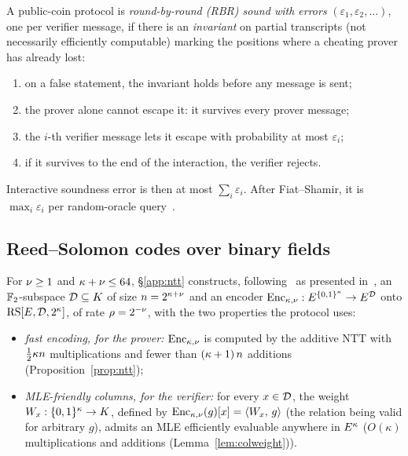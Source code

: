 \begin{definition}\label{def:rbr}
A public-coin protocol is \emph{round-by-round (RBR) sound with errors} $(\varepsilon_1, \varepsilon_2, \dots)$, one per verifier message, if there is an \emph{invariant} on partial transcripts (not necessarily efficiently computable) marking the positions where a cheating prover has already lost:
\begin{enumerate}[itemsep=1pt,label=(\roman*)]
\item on a false statement, the invariant holds before any message is sent;
\item the prover alone cannot escape it: it survives every prover message;
\item the $i$-th verifier message lets it escape with probability at most $\varepsilon_i$;
\item if it survives to the end of the interaction, the verifier rejects.
\end{enumerate}
\end{definition}

Interactive soundness error is then at most $\sum_i \varepsilon_i$. After Fiat--Shamir, it is $\max_i \varepsilon_i$ per random-oracle query~\cite{CCHLRR19,BCS16}.

\subsection{Reed--Solomon codes over binary fields}\label{sec:binary-rs}

For $\nu \ge 1$ and $\kappa + \nu \le 64$, \S\ref{app:ntt} constructs, following~\cite{LCH14} as presented in~\cite{DP24}, an $\mathbb{F}_2$-subspace $\mathcal{D} \subseteq K$ of size $n = 2^{\kappa+\nu}$ and an encoder $\mathrm{Enc}_{\kappa,\nu} : E^{\{0,1\}^{\kappa}} \to E^{\mathcal{D}}$ onto $\mathrm{RS}[E, \mathcal{D}, 2^{\kappa}]$, of rate $\rho = 2^{-\nu}$, with the two properties the protocol uses:
\begin{itemize}[itemsep=2pt]
\item \emph{fast encoding, for the prover:} $\mathrm{Enc}_{\kappa,\nu}$ is computed by the additive NTT with $\tfrac12 \kappa n$ multiplications and fewer than $(\kappa + 1)\, n$ additions (Proposition~\ref{prop:ntt});
\item \emph{MLE-friendly columns, for the verifier:} for every $x \in \mathcal{D}$, the weight $W_x : \{0,1\}^{\kappa} \to K$, defined by $\mathrm{Enc}_{\kappa,\nu}(g)[x] = \langle W_x,\, g \rangle$ (the relation being valid for arbitrary $g$), admits an MLE efficiently evaluable anywhere in $E^{\kappa}$ ($O(\kappa)$ multiplications and additions (Lemma~\ref{lem:colweight})).
\end{itemize}

